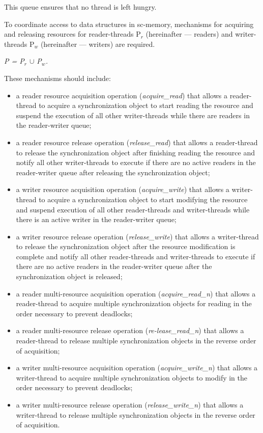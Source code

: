 \documentclass[10pt, a4paper]{article}
\begin{document}
\begin{multicols}{2}
This queue ensures that no thread is left hungry.

To coordinate access to data structures in sc-memory, mechanisms for acquiring and releasing resources for reader-threads P$_{r}$ (hereinafter — readers) and writer- threads P$_{w}$ (hereinafter — writers) are required.

\begin{center}
    \textit{P = P$_{r}$ $\cup$ P$_{w}$.}
\end{center}
These mechanisms should include:
\begin{itemize}
\setlength{\parskip}{0pt}
\setlength{\itemsep}{0pt}
    \item a reader resource acquisition operation (\textit{acquire\_read}) that allows a reader-thread to acquire a synchronization object to start reading the resource and suspend the execution of all other writer-threads while there are readers in the reader-writer queue;
    \item  a reader resource release operation (\textit{release\_read}) that allows a reader-thread to release the synchronization object after finishing reading the resource and notify all other writer-threads to execute if there are no active readers in the reader-writer queue after releasing the synchronization object;
    \item a writer resource acquisition operation (\textit{acquire\_write}) that allows a writer-thread to acquire a synchronization object to start modifying the resource and suspend execution of all other reader-threads and writer-threads while there is an active writer in the reader-writer queue;
    \item a writer resource release operation (\textit{release\_write}) that allows a writer-thread to release the synchronization object after the resource modification is complete and notify all other reader-threads and writer-threads to execute if there are no active readers in the reader-writer queue after the synchronization object is released;
    \item a reader multi-resource acquisition operation (\textit{acquire\_read\_n}) that allows a reader-thread to acquire multiple synchronization objects for reading in the order necessary to prevent deadlocks;
    \item a reader multi-resource release operation (\textit{re-lease\_read\_n}) that allows a reader-thread to release multiple synchronization objects in the reverse order of acquisition;
    \item a writer multi-resource acquisition operation (\textit{acquire\_write\_n}) that allows a writer-thread to acquire multiple synchronization objects to modify in the order necessary to prevent deadlocks;
    \item a writer multi-resource release operation (\textit{release\_write\_n}) that allows a writer-thread to release multiple synchronization objects in the reverse order of acquisition.
\end{itemize}


\end{multicols}
\end{document}
